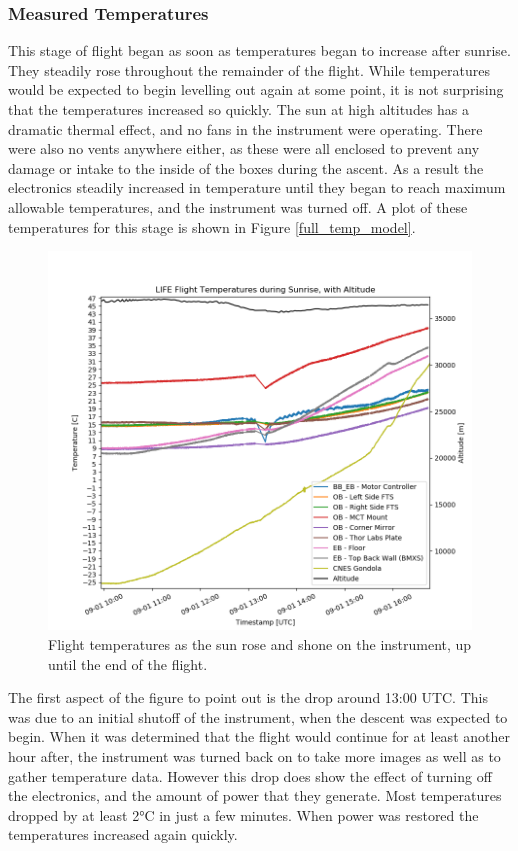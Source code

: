 \subsubsection{Measured Temperatures}
This stage of flight began as soon as temperatures began to increase after sunrise. They steadily rose throughout the remainder of the flight. While temperatures would be expected to begin levelling out again at some point, it is not surprising that the temperatures increased so quickly. The sun at high altitudes has a dramatic thermal effect, and no fans in the instrument were operating. There were also no vents anywhere either, as these were all enclosed to prevent any damage or intake to the inside of the boxes during the ascent. As a result the electronics steadily increased in temperature until they began to reach maximum allowable temperatures, and the instrument was turned off. A plot of these temperatures for this stage is shown in Figure \ref{full_temp_model}.

\begin{figure}
    \centering
    \includegraphics[width=\textwidth]{chap4_images/sunrise_images/sunrise_no_sim_temps.png}
    \caption{Flight temperatures as the sun rose and shone on the instrument, up until the end of the flight.}
    \label{fig:sunrise_temps_no_sims}
\end{figure}

The first aspect of the figure to point out is the drop around 13:00 UTC. This was due to an initial shutoff of the instrument, when the descent was expected to begin. When it was determined that the flight would continue for at least another hour after, the instrument was turned back on to take more images as well as to gather temperature data. However this drop does show the effect of turning off the electronics, and the amount of power that they generate. Most temperatures dropped by at least 2°C in just a few minutes. When power was restored the temperatures increased again quickly. 

